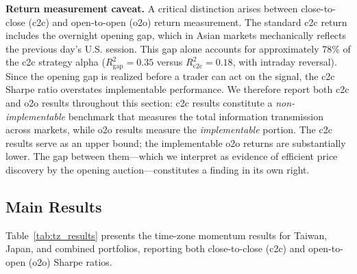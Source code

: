 \textbf{Return measurement caveat.} A critical distinction arises between close-to-close (c2c) and open-to-open (o2o) return measurement. The standard c2c return includes the overnight opening gap, which in Asian markets mechanically reflects the previous day's U.S. session. This gap alone accounts for approximately 78\% of the c2c strategy alpha ($R^2_{\text{gap}} = 0.35$ versus $R^2_{\text{c2c}} = 0.18$, with intraday reversal). Since the opening gap is realized before a trader can act on the signal, the c2c Sharpe ratio overstates implementable performance. %
We therefore report both c2c and o2o results throughout this section: c2c results constitute a \textit{non-implementable} benchmark that measures the total information transmission across markets, while o2o results measure the \textit{implementable} portion. The c2c results serve as an upper bound; the implementable o2o returns are substantially lower. The gap between them---which we interpret as evidence of efficient price discovery by the opening auction---constitutes a finding in its own right.

\subsection{Main Results}

Table~\ref{tab:tz_results} presents the time-zone momentum results for Taiwan, Japan, and combined portfolios, reporting both close-to-close (c2c) and open-to-open (o2o) Sharpe ratios.

